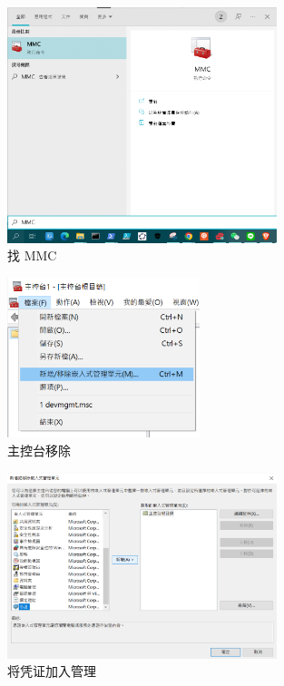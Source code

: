 \begin{figure}[htb]
\centering 
\includegraphics[width=0.70\textwidth]{img/ch1s3m1.png} 
\caption{找 MMC}
\label{Test}
\end{figure}

\begin{figure}[htb]
\centering 
\includegraphics[width=0.50\textwidth]{img/ch1s3m2.png} 
\caption{主控台移除}
\label{Test}
\end{figure}

\begin{figure}[htb]
\centering 
\includegraphics[width=0.70\textwidth]{img/ch1s3m3.png} 
\caption{将凭证加入管理}
\label{Test}
\end{figure}

